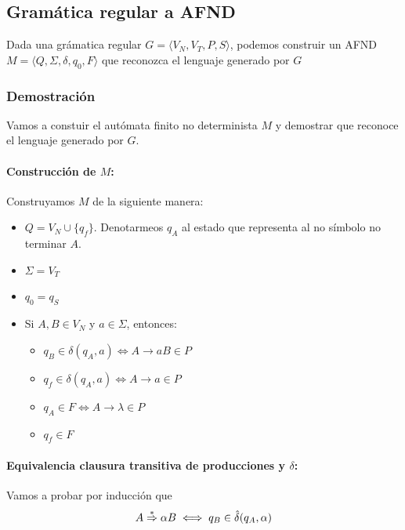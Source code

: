 \subsection{Gramática regular a AFND}
Dada una grámatica regular \(G = \langle V_N, V_T, P, S\rangle\), podemos construir un AFND \\ \(M=\langle Q,\Sigma, \delta, q_0, F\rangle\) que reconozca el lenguaje generado por \(G\)

\subsubsection{Demostración}
Vamos a constuir el autómata finito no determinista \(M\) y demostrar que reconoce el lenguaje generado por \(G\).
\paragraph{Construcción de \(M\):} Construyamos \(M\) de la siguiente manera:
\begin{itemize}
  \item \(Q = V_N\cup\{q_f\}\). Denotarmeos \(q_A\) al estado que representa al no símbolo no terminar \(A\).
  \item \(\Sigma = V_T\)
  \item \(q_0 = q_S\)
  \item Si \(A, B \in V_N\) y \(a\in\Sigma\), entonces:
        \begin{itemize}
          \item \(q_B\in\delta(q_A, a) \iff A \rightarrow aB \in P\)
          \item \(q_f \in \delta(q_A, a) \iff A \rightarrow a \in P\)
          \item \(q_A\in F \iff A \rightarrow \lambda \in P\)
          \item \(q_f\in F\)
        \end{itemize}
\end{itemize}

\paragraph{Equivalencia clausura transitiva de producciones y \(\delta\): } Vamos a probar por inducción que
\[A   \overset{*}{\Rightarrow} \alpha B \iff q_B\in\hat\delta(q_A, \alpha)\]

